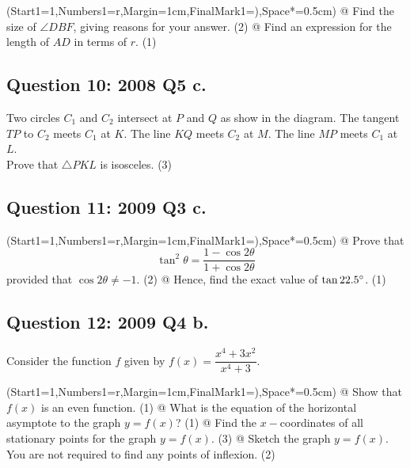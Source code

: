 \documentclass[a4paper,11pt]{article}
\begin{document}
\begin{easylist}
	\ListProperties(Start1=1,Numbers1=r,Margin=1cm,FinalMark1={)},Space*=0.5cm)
	@ Find the size of $\angle DBF$, giving reasons for your answer. (2)
	@ Find an expression for the length of $AD$ in terms of $r$. (1)
\end{easylist}

\subsection*{Question 10: 2008 Q5 c.}
\begin{center}
\end{center}
Two circles $C_1$ and $C_2$ intersect at $P$ and $Q$ as show in the diagram. The tangent $TP$ to $C_2$ meets $C_1$ at $K$. The line $KQ$ meets $C_2$ at $M$. The line $MP$ meets $C_1$ at $L$.\\

\noindent Prove that $\triangle PKL$ is isosceles. (3)

\subsection*{Question 11: 2009 Q3 c.}
\begin{easylist}
	\ListProperties(Start1=1,Numbers1=r,Margin=1cm,FinalMark1={)},Space*=0.5cm)
	@ Prove that
	$$
	\tan^2\theta = \frac{1-\cos 2\theta}{1+\cos 2\theta}
	$$
	provided that $\cos 2\theta\neq -1$. (2)
	@ Hence, find the exact value of $\tan 22.5\degree$. (1)
\end{easylist}

\subsection*{Question 12: 2009 Q4 b.}
Consider the function $f$ given by $f(x) = \dfrac{x^4+3x^2}{x^4+3}$.
\begin{easylist}
	\ListProperties(Start1=1,Numbers1=r,Margin=1cm,FinalMark1={)},Space*=0.5cm)
	@ Show that $f(x)$ is an even function. (1)
    @ What is the equation of the horizontal asymptote to the graph $y=f(x)$? (1)
    @ Find the $x-$coordinates of all stationary points for the graph $y=f(x)$. (3)
    @ Sketch the graph $y=f(x)$. You are not required to find any points of inflexion. (2)
\end{easylist}
\end{document}
